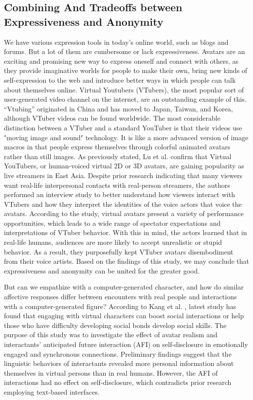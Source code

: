 \subsection{Combining And Tradeoffs between Expressiveness and Anonymity}
We have various expression tools in today's online world, such as blogs and forums. But a lot of them are cumbersome or lack expressiveness. Avatars are an exciting and promising new way to express oneself and connect with others, as they provide imaginative worlds for people to make their own, bring new kinds of self-expression to the web and introduce better ways in which people can talk about themselves online. Virtual Youtubers (VTubers), the most popular sort of user-generated video channel on the internet, are an outstanding example of this. “Vtubing” originated in China and has moved to Japan, Taiwan, and Korea, although VTuber videos can be found worldwide. The most considerable distinction between a VTuber and a standard YouTuber is that their videos use "moving image and sound" technology. It is like a more advanced version of image macros in that people express themselves through colorful animated avatars rather than still images. As previously stated, Lu et al. \cite{LU21} confirm that Virtual YouTubers, or human-voiced virtual 2D or 3D avatars, are gaining popularity as live streamers in East Asia. Despite prior research indicating that many viewers want real-life interpersonal contacts with real-person streamers, the authors performed an interview study to better understand how viewers interact with VTubers and how they interpret the identities of the voice actors that voice the avatars. According to the study, virtual avatars present a variety of performance opportunities, which leads to a wide range of spectator expectations and interpretations of VTuber behavior. With this in mind, the actors learned that in real-life humans, audiences are more likely to accept unrealistic or stupid behavior. As a result, they purposefully kept VTuber avatars disembodiment from their voice artists. Based on the findings of this study, we may conclude that expressiveness and anonymity can be united for the greater good.

But can we empathize with a computer-generated character, and how do similar affective responses differ between encounters with real people and interactions with a computer-generated figure? According to Kang et al. \cite{KAN10A}, latest study has found that engaging with virtual characters can boost social interactions or help those who have difficulty developing social bonds develop social skills. The purpose of this study was to investigate the effect of avatar realism and interactants' anticipated future interaction (AFI) on self-disclosure in emotionally engaged and synchronous connections. Preliminary findings suggest that the linguistic behaviors of interactants revealed more personal information about themselves in virtual persons than in real humans. However, the AFI of interactions had no effect on self-disclosure, which contradicts prior research employing text-based interfaces.

